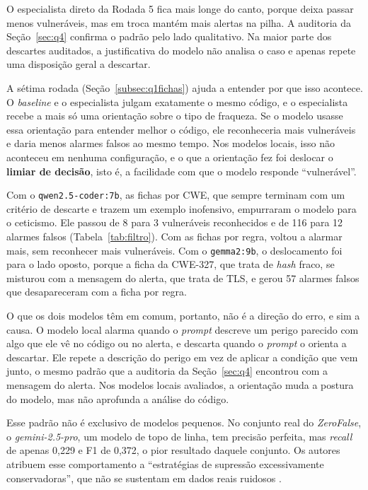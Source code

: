 O especialista direto da Rodada 5 fica mais longe do canto, porque deixa passar menos vulneráveis, mas em troca mantém mais alertas na pilha. A auditoria da Seção~\ref{sec:q4} confirma o padrão pelo lado qualitativo. Na maior parte dos descartes auditados, a justificativa do modelo não analisa o caso e apenas repete uma disposição geral a descartar.

A sétima rodada (Seção~\ref{subsec:q1fichas}) ajuda a entender por que isso acontece. O \textit{baseline} e o especialista julgam exatamente o mesmo código, e o especialista recebe a mais só uma orientação sobre o tipo de fraqueza. Se o modelo usasse essa orientação para entender melhor o código, ele reconheceria mais vulneráveis e daria menos alarmes falsos ao mesmo tempo. Nos modelos locais, isso não aconteceu em nenhuma configuração, e o que a orientação fez foi deslocar o \textbf{limiar de decisão}, isto é, a facilidade com que o modelo responde ``vulnerável''.

Com o \texttt{qwen2.5-coder:7b}, as fichas por CWE, que sempre terminam com um critério de descarte e trazem um exemplo inofensivo, empurraram o modelo para o ceticismo. Ele passou de 8 para 3 vulneráveis reconhecidos e de 116 para 12 alarmes falsos (Tabela~\ref{tab:filtro}). Com as fichas por regra, voltou a alarmar mais, sem reconhecer mais vulneráveis. Com o \texttt{gemma2:9b}, o deslocamento foi para o lado oposto, porque a ficha da CWE-327, que trata de \textit{hash} fraco, se misturou com a mensagem do alerta, que trata de TLS, e gerou 57 alarmes falsos que desapareceram com a ficha por regra.

O que os dois modelos têm em comum, portanto, não é a direção do erro, e sim a causa. O modelo local alarma quando o \textit{prompt} descreve um perigo parecido com algo que ele vê no código ou no alerta, e descarta quando o \textit{prompt} o orienta a descartar. Ele repete a descrição do perigo em vez de aplicar a condição que vem junto, o mesmo padrão que a auditoria da Seção~\ref{sec:q4} encontrou com a mensagem do alerta. Nos modelos locais avaliados, a orientação muda a postura do modelo, mas não aprofunda a análise do código.

Esse padrão não é exclusivo de modelos pequenos. No conjunto real do \textit{ZeroFalse}, o \textit{gemini-2.5-pro}, um modelo de topo de linha, tem precisão perfeita, mas \textit{recall} de apenas 0,229 e F1 de 0,372, o pior resultado daquele conjunto. Os autores atribuem esse comportamento a ``estratégias de supressão excessivamente conservadoras'', que não se sustentam em dados reais ruidosos \cite{iranmanesh2025zerofalseimprovingprecisionstatic}.

